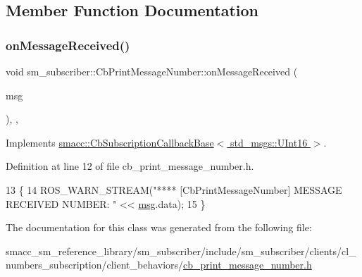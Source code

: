 \subsection{Member Function Documentation}
\mbox{\label{classsm__subscriber_1_1CbPrintMessageNumber_a8f9a13e3da3fd897354579a31cb9de3f}} 
\subsubsection{\texorpdfstring{on\+Message\+Received()}{onMessageReceived()}}
{\footnotesize\ttfamily void sm\+\_\+subscriber\+::\+Cb\+Print\+Message\+Number\+::on\+Message\+Received (\begin{DoxyParamCaption}\item[{const std\+\_\+msgs\+::\+U\+Int16 \&}]{msg }\end{DoxyParamCaption})\hspace{0.3cm}{\ttfamily [inline]}, {\ttfamily [override]}, {\ttfamily [virtual]}}



Implements \hyperlink{classsmacc_1_1CbSubscriptionCallbackBase_a77d8d3eee701b990277e69804eac0049}{smacc\+::\+Cb\+Subscription\+Callback\+Base$<$ std\+\_\+msgs\+::\+U\+Int16 $>$}.



Definition at line 12 of file cb\+\_\+print\+\_\+message\+\_\+number.\+h.


\begin{DoxyCode}
13   \{
14     ROS\_WARN\_STREAM(\textcolor{stringliteral}{"**** [CbPrintMessageNumber] MESSAGE RECEIVED NUMBER: "} << 
      \hyperlink{namespacebattery__monitor__node_ab1920c64448816edd4064e494275fdff}{msg}.data);
15   \}
\end{DoxyCode}


The documentation for this class was generated from the following file\+:\begin{DoxyCompactItemize}
\item 
smacc\+\_\+sm\+\_\+reference\+\_\+library/sm\+\_\+subscriber/include/sm\+\_\+subscriber/clients/cl\+\_\+numbers\+\_\+subscription/client\+\_\+behaviors/\hyperlink{cb__print__message__number_8h}{cb\+\_\+print\+\_\+message\+\_\+number.\+h}\end{DoxyCompactItemize}
